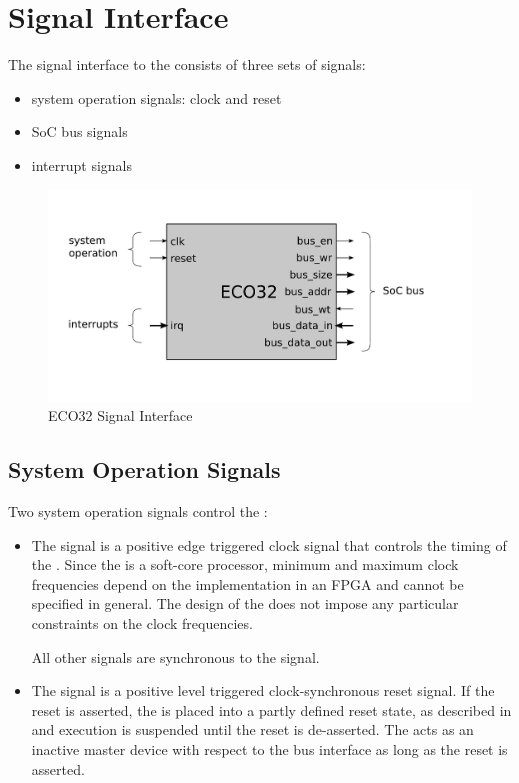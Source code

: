 \chapter{Signal Interface}

The signal interface to the \eco consists of three sets of signals:
\begin{itemize}
\item system operation signals: clock and reset
\item SoC bus signals
\item interrupt signals
\end{itemize}

\begin{figure}[h]
\includegraphics[scale=0.4]{./signals.pdf}
\caption{ECO32 Signal Interface}
\end{figure}

\section{System Operation Signals}

Two system operation signals control the \ecox:
\begin{itemize}
\item The  signal is a positive edge triggered clock signal that controls the timing of the \ecox. Since the \eco is a soft-core processor, minimum and maximum clock frequencies depend on the implementation in an FPGA and cannot be specified in general. The design of the \eco does not impose any particular constraints on the clock frequencies.

All other signals are synchronous to the  signal.

\item The  signal is a positive level triggered clock-synchronous reset signal. If the reset is asserted, the \eco is placed into a partly defined reset state, as described in  and execution is suspended until the reset is de-asserted. The \eco acts as an inactive master device with respect to the bus interface as long as the reset is asserted.
\end{itemize}

